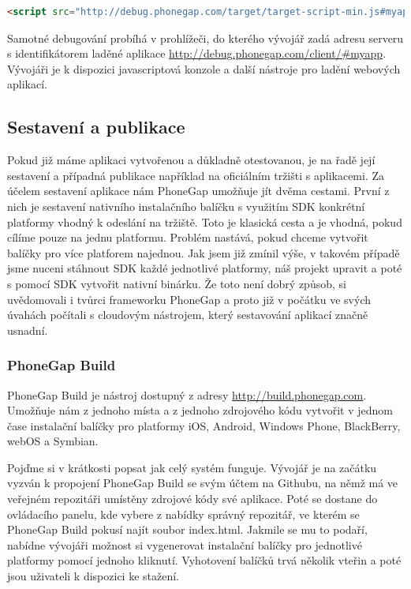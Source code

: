 \begin{lstlisting}[language=HTML,breaklines=true]
<script src="http://debug.phonegap.com/target/target-script-min.js#myapp"></script>
\end{lstlisting}

Samotné debugování probíhá v prohlížeči, do kterého vývojář zadá adresu serveru s identifikátorem laděné aplikace \url{http://debug.phonegap.com/client/\#myapp}. Vývojáři je k dispozici javascriptová konzole a další nástroje pro ladění webových aplikací.

\subsection{Sestavení a publikace}
Pokud již máme aplikaci vytvořenou a důkladně otestovanou, je na řadě její sestavení a případná publikace například na oficiálním tržišti s aplikacemi. Za účelem sestavení aplikace nám PhoneGap umožňuje jít dvěma cestami. První z nich je sestavení nativního instalačního balíčku s využitím SDK konkrétní platformy vhodný k odeslání na tržiště. Toto je klasická cesta a je vhodná, pokud cílíme pouze na jednu platformu. Problém nastává, pokud chceme vytvořit balíčky pro více platforem najednou. Jak jsem již zmínil výše, v takovém případě jsme nuceni stáhnout SDK každé jednotlivé platformy, náš projekt upravit a poté s pomocí SDK vytvořit nativní binárku. Že toto není dobrý způsob, si uvědomovali i tvůrci frameworku PhoneGap a proto již v počátku ve svých úvahách počítali s cloudovým nástrojem, který sestavování aplikací značně usnadní.

\subsubsection{PhoneGap Build} \label{Sec:PhoneGapBuild}
PhoneGap Build je nástroj dostupný z adresy \url{http://build.phonegap.com}. Umožňuje nám z jednoho místa a z jednoho zdrojového kódu vytvořit v jednom čase instalační balíčky pro platformy iOS, Android, Windows Phone, BlackBerry, webOS a Symbian.

Pojďme si v krátkosti popsat jak celý systém funguje. Vývojář je na začátku vyzván k propojení PhoneGap Build se svým účtem na Githubu, na němž má ve veřejném repozitáři umístěny zdrojové kódy své aplikace. Poté se dostane do ovládacího panelu, kde vybere z nabídky správný repozitář, ve kterém se PhoneGap Build pokusí najít soubor index.html. Jakmile se mu to podaří, nabídne vývojáři možnost si vygenerovat instalační balíčky pro jednotlivé platformy pomocí jednoho kliknutí. Vyhotovení balíčků trvá několik vteřin a poté jsou uživateli k dispozici ke stažení.

